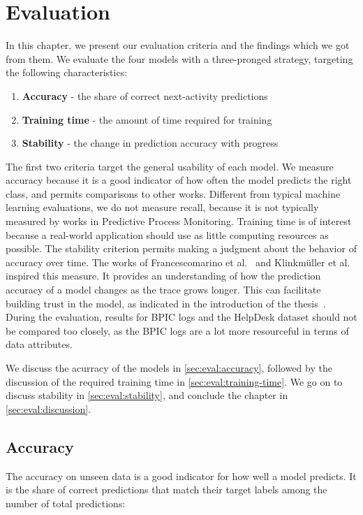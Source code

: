 \chapter{Evaluation}\label{chap:evaluation}
In this chapter, we present our evaluation criteria and the findings which we got from them.
We evaluate the four models with a three-pronged strategy, targeting the following characteristics:

\begin{enumerate}
    \item\textbf{Accuracy} - the share of correct next-activity predictions
    \item\textbf{Training time} - the amount of time required for training
    \item\textbf{Stability} - the change in prediction accuracy with progress
\end{enumerate}

The first two criteria target the general usability of each model.
We measure accuracy because it is a good indicator of how often the model predicts the right class, and permits comparisons to other works.
Different from typical machine learning evaluations, we do not measure recall, because it is not typically measured by works in Predictive Process Monitoring.
Training time is of interest because a real-world application should use as little computing resources as possible.
The stability criterion permits making a judgment about the behavior of accuracy over time. The works of Francescomarino et al.~\cite{francescomarino2015} and Klinkmüller et al.~\cite{klinkmuller2018reliablemonitoring} inspired this measure. It provides an understanding of how the prediction accuracy of a model changes as the trace grows longer. This can facilitate building trust in the model, as indicated in the introduction of the thesis~\cite{klinkmuller2018reliablemonitoring, boehmer2018probability}.
During the evaluation, results for BPIC logs and the HelpDesk dataset should not be compared too closely, as the BPIC logs are a lot more resourceful in terms of data attributes.

We discuss the acurracy of the models in \autoref{sec:eval:accuracy}, followed by the discussion of the required training time in \autoref{sec:eval:training-time}. We go on to discuss stability in \autoref{sec:eval:stability}, and conclude the chapter in \autoref{sec:eval:discussion}.

\section{Accuracy}\label{sec:eval:accuracy}
The accuracy on unseen data is a good indicator for how well a model predicts.
It is the share of correct predictions that match their target labels among the number of total predictions:

